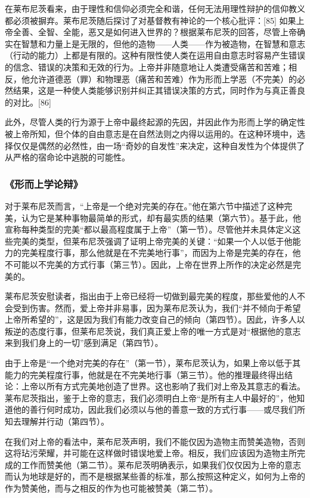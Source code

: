 在莱布尼茨看来，由于理性和信仰必须完全和谐，任何无法用理性辩护的信仰教义都必须被摒弃。莱布尼茨随后探讨了对基督教有神论的一个核心批评：[85] 如果上帝全善、全智、全能，恶又是如何进入世界的？根据莱布尼茨的回答，尽管上帝确实在智慧和力量上是无限的，但他的造物——人类——作为被造物，在智慧和意志（行动的能力）上都是有限的。这种有限性使人类在运用自由意志时容易产生错误的信念、错误的决策和无效的行为。上帝并非随意地让人类遭受痛苦和苦难；相反，他允许道德恶（罪）和物理恶（痛苦和苦难）作为形而上学恶（不完美）的必然结果，这是一种使人类能够识别并纠正其错误决策的方式，同时作为与真正善良的对比。[86]  

此外，尽管人类的行为源于上帝中最终起源的先因，并因此作为形而上学的确定性被上帝所知，但个体的自由意志是在自然法则之内得以运用的。在这种环境中，选择仅仅是偶然的必然性，由一场“奇妙的自发性”来决定，这种自发性为个体提供了从严格的宿命论中逃脱的可能性。
\subsubsection{《形而上学论辩》}
对于莱布尼茨而言，“上帝是一个绝对完美的存在。”他在第六节中描述了这种完美，认为它是某种事物最简单的形式，却有最实质的结果（第六节）。基于此，他宣称每种类型的完美“都以最高程度属于上帝”（第一节）。尽管他并未具体定义这些完美的类型，但莱布尼茨强调了证明上帝完美的关键：“如果一个人以低于他能力的完美程度行事，那么他就是在不完美地行事”，而因为上帝是完美的存在，他不可能以不完美的方式行事（第三节）。因此，上帝在世界上所作的决定必然是完美的。  

莱布尼茨安慰读者，指出由于上帝已经将一切做到最完美的程度，那些爱他的人不会受到伤害。然而，爱上帝并非易事，因为莱布尼茨认为，我们“并不倾向于希望上帝所希望的”，这是因为我们有能力改变自己的倾向（第四节）。因此，许多人以叛逆的态度行事，但莱布尼茨说，我们真正爱上帝的唯一方式是对“根据他的意志来到我们身上的一切”感到满足（第四节）。

由于上帝是“一个绝对完美的存在”（第一节），莱布尼茨认为，如果上帝以低于其能力的完美程度行事，他就是在不完美地行事（第三节）。他的推理最终得出结论：上帝以所有方式完美地创造了世界。这也影响了我们对上帝及其意志的看法。莱布尼茨指出，鉴于上帝的意志，我们必须明白上帝“是所有主人中最好的”，他知道他的善行何时成功，因此我们必须以与他的善意一致的方式行事——或尽我们所知去理解并行动（第四节）。  

在我们对上帝的看法中，莱布尼茨声明，我们不能仅因为造物主而赞美造物，否则这将玷污荣耀，并可能在这样做时错误地爱上帝。相反，我们应该因为造物主所完成的工作而赞美他（第二节）。莱布尼茨明确表示，如果我们仅仅因为上帝的意志而认为地球是好的，而不是根据某些善的标准，那么按照这种定义，如何为上帝的作为赞美他，而与之相反的作为也可能被赞美（第二节）。  

